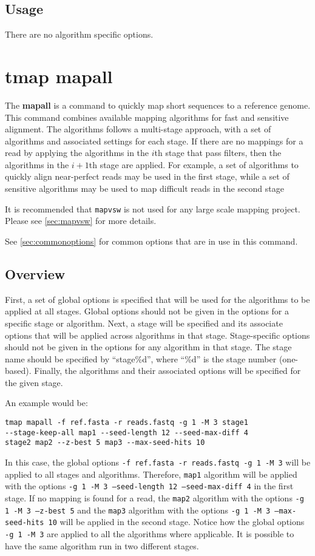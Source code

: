 \documentclass[a4paper,12pt]{book}
\newcommand{\TT}[1]{{\tt #1}} %
\newcommand{\BF}[1]{{\bf #1}} %
\begin{document}
\subsection{Usage}
There are no algorithm specific options.

\section{tmap mapall}
\label{sec:mapall}
The \BF{mapall} is a command to quickly map short sequences to a reference genome.
This command combines available mapping algorithms for fast and sensitive alignment.
The algorithms follows a multi-stage approach, with a set of algorithms and associated settings for each stage.
If there are no mappings for a read by applying the algorithms in the $i$th stage that pass filters, then the algorithms in the $i+1$th stage are applied. 
For example, a set of algorithms to quickly align near-perfect reads may be used in the first stage, while a set of sensitive algorithms may be used to map difficult reads in the second stage

It is recommended that \TT{mapvsw} is not used for any large scale mapping project.  
Please see \autoref{sec:mapvsw} for more details.

See \autoref{sec:commonoptions} for common options that are in use in this command.

\subsection{Overview}
First, a set of global options is specified that will be used for the algorithms to be applied at all stages.
Global options should not be given in the options for a specific stage or algorithm.
Next, a stage will be specified and its associate options that will be applied across algorithms in that stage.
Stage-specific options should not be given in the options for any algorithm in that stage.
The stage name should be specified by ``stage\%d'', where ``\%d'' is the stage number (one-based).
Finally, the algorithms and their associated options will be specified for the given stage.

An example would be:
\begin{verbatim}
tmap mapall -f ref.fasta -r reads.fastq -g 1 -M 3 stage1 
--stage-keep-all map1 --seed-length 12 --seed-max-diff 4 
stage2 map2 --z-best 5 map3 --max-seed-hits 10
\end{verbatim}
In this case, the global options \TT{-f ref.fasta -r reads.fastq -g 1 -M 3} will be applied to all stages and algorithms. 
Therefore, \TT{map1} algorithm will be applied with the options \TT{-g 1 -M 3 --seed-length 12 --seed-max-diff 4} in the first stage.
If no mapping is found for a read, the \TT{map2} algorithm with the options \TT{-g 1 -M 3 --z-best 5} and the \TT{map3} algorithm with the options \TT{-g 1 -M 3 --max-seed-hits 10} will be applied in the second stage.
Notice how the global options \TT{-g 1 -M 3} are applied to all the algorithms where applicable.
It is possible to have the same algorithm run in two different stages.
\end{document}
